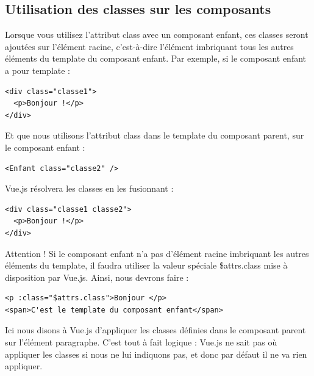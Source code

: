\documentclass{article}
\begin{document}
\subsection{Utilisation des classes sur les composants}
Lorsque vous utilisez l'attribut {\color{monOrange}class} avec un composant enfant, ces classes seront ajoutées sur l'élément racine, c'est-à-dire l'élément imbriquant tous les autres éléments du {\color{monOrange}template} du composant enfant. Par exemple, si le composant enfant a pour {\color{monOrange}template} :
\begin{verbatim}
<div class="classe1">
  <p>Bonjour !</p>
</div>
\end{verbatim}
Et que nous utilisons l'attribut {\color{monOrange}class} dans le {\color{monOrange}template} du composant parent, sur le composant enfant :
\begin{verbatim}
<Enfant class="classe2" />
\end{verbatim}
{\color{monOrange}Vue.js} résolvera les classes en les fusionnant :
\begin{verbatim}
<div class="classe1 classe2">
  <p>Bonjour !</p>
</div>
\end{verbatim}
Attention ! Si le composant enfant n'a pas d'élément racine imbriquant les autres éléments du {\color{monOrange}template}, il faudra utiliser la valeur spéciale {\color{monOrange}\$attrs.class} mise à disposition par {\color{monOrange}Vue.js}. Ainsi, nous devrons faire :
\begin{verbatim}
<p :class="$attrs.class">Bonjour </p>
<span>C'est le template du composant enfant</span>
\end{verbatim}
Ici nous disons à {\color{monOrange}Vue.js} d'appliquer les classes définies dans le composant parent sur l'élément paragraphe. C'est tout à fait logique : {\color{monOrange}Vue.js} ne sait pas où appliquer les classes si nous ne lui indiquons pas, et donc par défaut il ne va rien appliquer.
\end{document}
